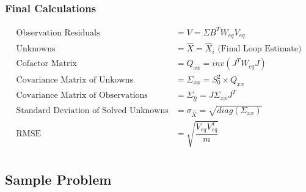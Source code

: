 \subsubsection{Final Calculations}
\begin{align*}
	\text{Observation Residuals} &= V = \Sigma B^T W_{eq} V_{eq} \\
	\text{Unknowns} &= \hat{X} = \hat{X}_i \text{   (Final Loop Estimate)}\\
	\text{Cofactor Matrix} &= Q_{xx} = inv(J^TW_{eq}J) \\
	\text{Covariance Matrix of Unkowns} &= \Sigma_{xx} = S_0^2 \times Q_{xx} \\
	\text{Covariance Matrix of Observations} &= \Sigma_{\hat{l}\hat{l}} = J \Sigma_{xx} J^T \\
	\text{Standard Deviation of Solved Unknowns} &= \sigma_{\hat{X}} = \sqrt{diag(\Sigma_{xx})} \\
	\text{RMSE } &= \sqrt{\dfrac{V_{eq}V_{eq}^T}{m}} \\
\end{align*}
\clearpage
\subsection{Sample Problem}

